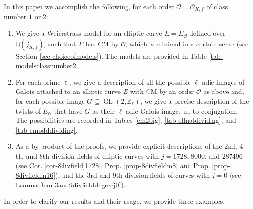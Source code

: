 \documentclass[11pt]{amsart}
\theoremstyle{definition}
\newcommand{\Q}{\mathbb Q}
\newcommand{\Z}{\mathbb Z}
\newcommand{\GL}{\operatorname{GL}}
\begin{document}
In this paper we accomplish the following, for each order $\mathcal{O}=\mathcal{O}_{K,f}$ of class number $1$ or $2$:
\begin{enumerate}
    \item We give a Weierstrass model for an elliptic curve $E=E_{\mathcal{O}}$ defined over $\Q(j_{K,f})$, such that $E$ has CM by $\mathcal{O}$, which is minimal in a certain sense (see Section \ref{sec-choiceofmodels}). The models are provided in Table \ref{tab-modelsclassnumber2}.
    \item For each prime $\ell$, we give a description of all the possible $\ell$-adic images of Galois attached to an elliptic curve $E$ with CM by an order $\mathcal{O}$ as above and, for each possible image $G\subseteq \GL(2,\Z_\ell)$, we give a precise description of the twists of $E_{\mathcal{O}}$ that have $G$ as their $\ell$-adic Galois image, up to conjugation. The possibilities are recorded in Tables \ref{cm2big}, \ref{tab-ellnotdividing}, 
 and \ref{tab-cmodddividing}.
    \item As a by-product of the proofs, we provide explicit descriptions of the $2$nd, $4$th, and $8$th division fields of elliptic curves with $j=1728$, $8000$, and $287496$ (see Cor. \ref{cor-8divfieldj1728}, Prop. \ref{prop-8divfieldm8} and Prop. \ref{prop-8divfieldm16}), and the $3$rd and $9$th division fields of curves with $j=0$ (see Lemma \ref{lem-3and9divfielddegreej0}).
\end{enumerate}

In order to clarify our results and their usage, we provide three examples.
\end{document}
